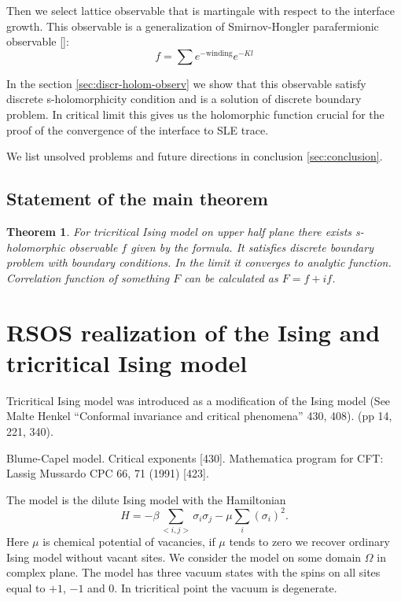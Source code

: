 \documentclass[12pt]{article}
\newtheorem{theorem}{Theorem}
\begin{document}
 Then we
select lattice observable that is martingale with respect to the interface growth.
This observable is a generalization of Smirnov-Hongler parafermionic observable []:
\begin{equation}
  \label{eq:3}
  f = \sum e^{-\mbox{winding}} e^{-Kl}
\end{equation}

In the section \ref{sec:discr-holom-observ} we show that this observable satisfy discrete s-holomorphicity
condition and is a solution of discrete boundary problem. In critical limit this gives us the
holomorphic function crucial for the proof of the convergence of the interface to SLE trace.

We list unsolved problems and future directions in conclusion \ref{sec:conclusion}.

\subsection{Statement of the main theorem}
\label{sec:results}

\begin{theorem}
  For tricritical Ising model on upper half plane there exists s-holomorphic observable $f$ given by the
  formula. It satisfies discrete boundary problem with boundary conditions. In the limit it
  converges to analytic function. Correlation function of something $F$ can be calculated as $F=f+if$.
\end{theorem}
\section{RSOS realization of the Ising and tricritical Ising model}
\label{sec:rsos-real-ising}

Tricritical Ising model was introduced as a modification of the Ising
model \cite{} (See Malte Henkel ``Conformal invariance and critical
phenomena'' 430, 408). (pp 14, 221, 340).  

Blume-Capel model. Critical exponents [430]. Mathematica program for CFT: Lassig Mussardo CPC 66, 71 (1991) [423].

 The model is
the dilute Ising model with the Hamiltonian 
\begin{equation}
  \label{eq:1}
  H = -\beta \sum_{<i,j>}\sigma_i\sigma_j - \mu \sum_{i}(\sigma_i)^2.
\end{equation}
Here $\mu$ is chemical potential of vacancies,
if $\mu$ tends to zero we recover ordinary Ising model without vacant sites. We consider the model on some domain
$\Omega$ in complex plane. The model has three vacuum states with the spins on all sites equal to
$+1$, $-1$ and $0$. In tricritical point the vacuum is degenerate. 
\end{document}
